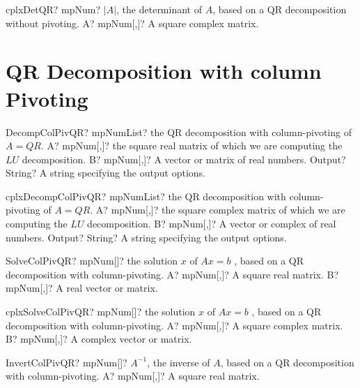 \documentclass[12pt,a4paper,openany]{book}
\begin{document}
\begin{mpFunctionsExtract}
\mpFunctionOne
{cplxDetQR? mpNum? $|A|$, the determinant of $A$, based on a QR decomposition without pivoting.}
{A? mpNum[,]? A square complex matrix.}
\end{mpFunctionsExtract}

\section{QR Decomposition with column Pivoting}

\begin{mpFunctionsExtract}
\mpFunctionThree
{DecompColPivQR? mpNumList? the QR decomposition with column-pivoting of $A = QR$.}
{A? mpNum[,]? the square real matrix of which we are computing the $LU$ decomposition.}
{B? mpNum[,]? A vector or matrix of real numbers.}
{Output? String? A string specifying the output options.}
\end{mpFunctionsExtract}

\begin{mpFunctionsExtract}
\mpFunctionThree
{cplxDecompColPivQR? mpNumList? the QR decomposition with column-pivoting of $A = QR$.}
{A? mpNum[,]? the square complex matrix of which we are computing the $LU$ decomposition.}
{B? mpNum[,]? A vector or complex of real numbers.}
{Output? String? A string specifying the output options.}
\end{mpFunctionsExtract}

\begin{mpFunctionsExtract}
\mpFunctionTwo
{SolveColPivQR? mpNum[]? the solution $x$ of $A x = b$ , based on a QR decomposition with column-pivoting.}
{A? mpNum[,]? A square real matrix.}
{B? mpNum[,]? A real vector or matrix.}
\end{mpFunctionsExtract}

\begin{mpFunctionsExtract}
\mpFunctionTwo
{cplxSolveColPivQR? mpNum[]? the solution $x$ of $A x = b$ , based on a QR decomposition with column-pivoting.}
{A? mpNum[,]? A square complex matrix.}
{B? mpNum[,]? A complex vector or matrix.}
\end{mpFunctionsExtract}

\begin{mpFunctionsExtract}
\mpFunctionOne
{InvertColPivQR? mpNum[]? $A^{-1}$, the inverse of $A$, based on a QR decomposition with column-pivoting.}
{A? mpNum[,]? A square real matrix.}
\end{mpFunctionsExtract}
\end{document}

